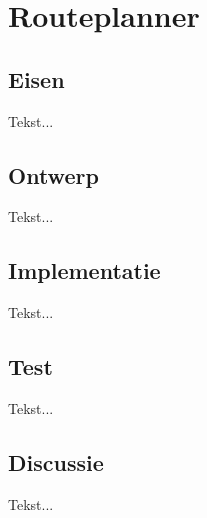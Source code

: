 \chapter[Routeplanner]{Routeplanner} \label {chapter:routeplanner}

	\section{Eisen}
		Tekst...
	\section{Ontwerp}
		Tekst...
	\section{Implementatie}
		Tekst...
	\section{Test}
		Tekst...
	\section{Discussie}
		Tekst...
